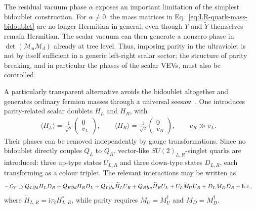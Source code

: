 \documentclass[review]{elsarticle}
\numberwithin{equation}{section}
\numberwithin{table}{section}
\numberwithin{figure}{section}
\def\i{\mathrm{i}}
\def\M{\mathcal{M}}
\def\hc{{\rm h.c.}}
\begin{document}
The residual vacuum phase $\alpha$ exposes an important limitation of the simplest bidoublet construction. For $\alpha\neq0$, the mass matrices in Eq.~\eqref{eq:LR-quark-mass-bidoublet} are no longer Hermitian in general, even though $Y$ and $\widetilde Y$ themselves remain Hermitian. The scalar vacuum can then generate a nonzero phase in $\det(\M_u\M_d)$ already at tree level. Thus, imposing parity in the ultraviolet is not by itself sufficient in a generic left-right scalar sector; the structure of parity breaking, and in particular the phases of the scalar VEVs, must also be controlled.

A particularly transparent alternative avoids the bidoublet altogether and generates ordinary fermion masses through a universal seesaw~\cite{Babu:1988mw,Babu:1989rb,Barr:1991qx}. One introduces parity-related scalar doublets $H_L$ and $H_R$, with
\begin{align}
    \langle H_L\rangle = \frac{1}{\sqrt{2}}
    \begin{pmatrix}
        0\\ v_L
    \end{pmatrix},
    \qquad
    \langle H_R\rangle = \frac{1}{\sqrt{2}}
    \begin{pmatrix}
        0\\ v_R
    \end{pmatrix},
    \qquad
    v_R\gg v_L.
    \label{eq:universal-seesaw-Higgs-vevs}
\end{align}
Their phases can be removed independently by gauge transformations. Since no bidoublet directly couples $Q_L$ to $Q_R$, vector-like $SU(2)_{L,R}$-singlet quarks are introduced: three up-type states $U_{L,R}$ and three down-type states $D_{L,R}$, each transforming as a colour triplet. The relevant interactions may be written as
\begin{align}
    -\mathcal{L}_{Y}\supset \bar Q_L y_dH_LD_R + \bar Q_R y_dH_RD_L +\bar Q_L y_u\widetilde H_L U_R + \bar Q_R y_u\widetilde H_R U_L + \bar U_LM_UU_R + \bar D_LM_DD_R +\hc ,
\end{align}
where $\widetilde H_{L,R}=\i\tau_2H_{L,R}^*$, while parity requires $M_U=M_U^\dagger$ and $M_D=M_D^\dagger$.
\end{document}
